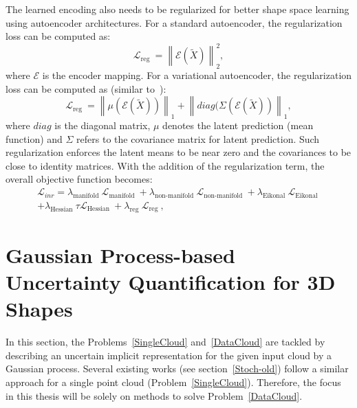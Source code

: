     The learned encoding also needs to be regularized for better shape space learning using autoencoder architectures. For a standard autoencoder, the regularization loss can be computed as:
    \begin{equation}\label{reg_latent}
        \mathcal{L}_{\text {reg }} = \left\|\mathcal{E}(\tilde{X})\right\|_2^2,
    \end{equation}
    where $\mathcal{E}$ is the encoder mapping. For a variational autoencoder, the  regularization loss can be computed as (similar to~\cite{SAL}):
    \begin{equation}\label{reg_latent}
        \mathcal{L}_{\text {reg }} = \left\|\mu\left(\mathcal{E}(\tilde{X})\right)\right\|_1 +\left\|diag(\Sigma\left(\mathcal{E}(\tilde{X})\right)\right\|_1,
    \end{equation}
    where $diag$ is the diagonal matrix, $\mu$ denotes the latent prediction (mean function) and $\Sigma$ refers to the covariance matrix for latent prediction. Such regularization enforces the latent means to be near zero and the covariances to be close to identity matrices. With the addition of the regularization term, the overall objective function becomes:
    \begin{equation}\label{Hessian3}
        \begin{aligned}
            \mathcal{L}_{inr}= \lambda_{\text {manifold }} \mathcal{L}_{\text {manifold }}+\lambda_{\text {non-manifold }} \mathcal{L}_{\text {non-manifold }}+ \lambda_{\text {Eikonal }} \mathcal{L}_{\text {Eikonal }}
            \\
            + \lambda_{\text{Hessian }} \tau \mathcal{L}_{\text{Hessian }} + \lambda_{\text {reg }} \mathcal{L}_{\text {reg }},
        \end{aligned}
    \end{equation}

    

\section{Gaussian Process-based Uncertainty Quantification for 3D Shapes}\label{gpuq}
In this section, the Problems~\ref{SingleCloud} and~\ref{DataCloud} are tackled by describing an uncertain implicit representation for the given input cloud by a Gaussian process. Several existing works (see section~\ref{Stoch-old}) follow a similar approach for a single point cloud (Problem~\ref{SingleCloud}). Therefore, the focus in this thesis will be solely on methods to solve Problem~\ref{DataCloud}.

